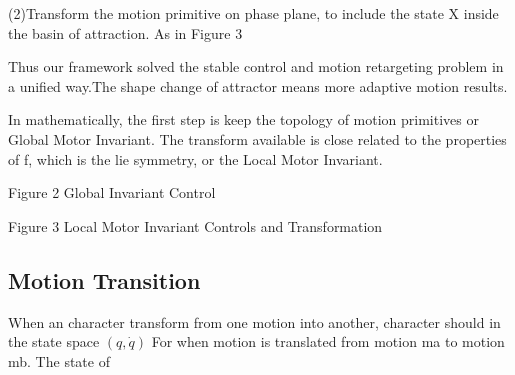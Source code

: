 (2)Transform the motion primitive on phase plane, to include the state X inside the basin of attraction. As in Figure 3

Thus our framework solved the stable control and motion retargeting problem in a unified way.The shape change of attractor means more adaptive motion results.

In mathematically, the first step is keep the topology of motion primitives or Global Motor Invariant. The transform available is close related to the properties of f, which is the lie symmetry, or the Local Motor Invariant.



Figure 2 Global Invariant Control




Figure 3 Local Motor Invariant Controls and Transformation

\subsection{Motion Transition}
When an character transform from one motion into another, character should in the state space $(q,\dot{q})$
For when motion is translated from motion ma to motion mb.
The state of %
